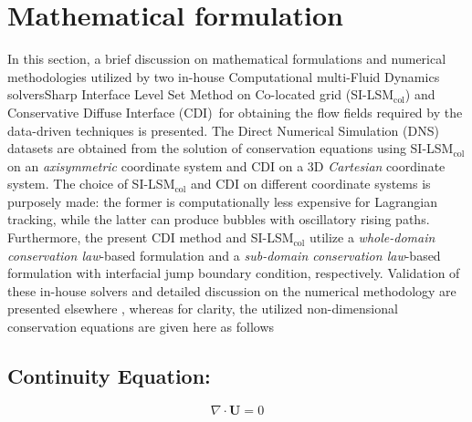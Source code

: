 \documentclass[a4paper,fleqn]{cas-sc}
\begin{document}
	
	\section{Mathematical formulation}
	\label{Mathematical formulation}
	In this section, a brief discussion on mathematical formulations and numerical methodologies utilized by two in-house Computational multi-Fluid Dynamics solvers\textemdash Sharp Interface Level Set Method on Co-located grid (SI-LSM$_{\text{col}}$) \cite{Chirammel2023} and Conservative Diffuse Interface (CDI)~\cite{Jain2020}\textemdash for obtaining the flow fields required by the data-driven techniques is presented.  The Direct Numerical Simulation (DNS) datasets are obtained from the solution of conservation equations using SI-LSM$_{\text{col}}$ on an \textit{axisymmetric} coordinate system and CDI on a 3D \textit{Cartesian} coordinate system. The choice of SI-LSM$_{\text{col}}$ and CDI on different coordinate systems is purposely made: the former is computationally less expensive for Lagrangian tracking, while the latter can produce bubbles with oscillatory rising paths. Furthermore, the present CDI method and SI-LSM$_{\text{col}}$ utilize a \textit{whole-domain conservation law}-based formulation and a \textit{sub-domain conservation law}-based formulation with interfacial jump boundary condition, respectively. Validation of these in-house solvers and detailed discussion on the numerical methodology are presented elsewhere \cite{Chirammel2023, Salimi2025}, whereas for clarity, the utilized non-dimensional conservation equations are given here as follows
	\subsection*{Continuity Equation:}
	\begin{equation}\label{eqt:continuity}
		\nabla\cdot\mathbf{U}=0
	\end{equation}
\end{document}
